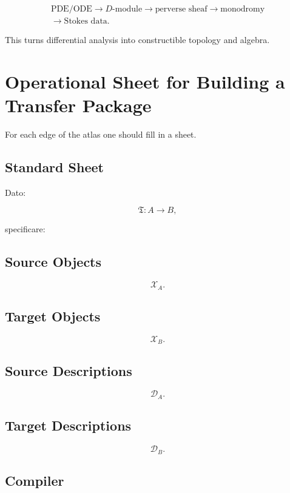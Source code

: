 \documentclass[11pt]{article}
\begin{document}
\[
\begin{gathered}
\text{PDE/ODE} \to D\text{-module} \to \text{perverse sheaf} \to \text{monodromy} \\
\to \text{Stokes data}.
\end{gathered}
\]

This turns differential analysis into constructible topology and algebra.



\section{Operational Sheet for Building a Transfer Package}

For each edge of the atlas one should fill in a sheet.



\subsection{Standard Sheet}

Dato:

\[
\mathfrak T:A\to B,
\]

specificare:

\subsection*{Source Objects}

\[
\mathcal X_A.
\]

\subsection*{Target Objects}

\[
\mathcal X_B.
\]

\subsection*{Source Descriptions}

\[
\mathcal D_A.
\]

\subsection*{Target Descriptions}

\[
\mathcal D_B.
\]

\subsection*{Compiler}
\end{document}
